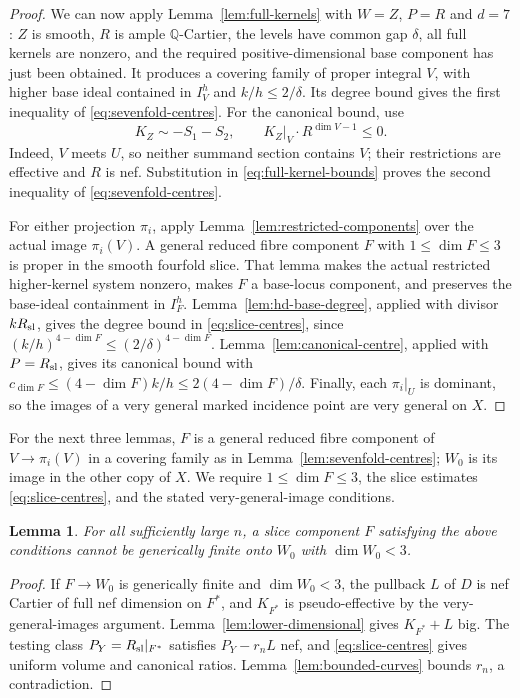 \documentclass[12pt,a4paper,psamsfonts]{amsart}
\theoremstyle{definition}
\theoremstyle{plain}
\newtheorem{lemma}{Lemma}[section]
\begin{document}
\begin{proof}
We can now apply Lemma~\ref{lem:full-kernels} with $W=Z$, $P=R$
and $d=7$: $Z$ is smooth, $R$ is ample $\mathbb{Q}$-Cartier, the
levels have common gap $\delta$, all full kernels are nonzero,
and the required positive-dimensional base component has just
been obtained. It produces a covering family of proper integral
$V$, with higher base ideal contained in $I_V^h$ and
$k/h\le2/\delta$. Its degree bound gives the first inequality
of \eqref{eq:sevenfold-centres}. For the canonical bound, use
\[
 K_Z\sim-S_1-S_2,\qquad
 K_Z|_V\cdot R^{\dim V-1}\le0.
\]
Indeed, $V$ meets $U$, so neither summand section contains $V$;
their restrictions are effective and $R$ is nef. Substitution
in \eqref{eq:full-kernel-bounds} proves the second inequality
of \eqref{eq:sevenfold-centres}.

For either projection $\pi_i$, apply
Lemma~\ref{lem:restricted-components} over the actual image
$\pi_i(V)$. A general reduced fibre component $F$ with
$1\le\dim F\le3$ is proper in the smooth fourfold slice.
That lemma makes the actual restricted higher-kernel system
nonzero, makes $F$ a base-locus component, and preserves the
base-ideal containment in $I_F^h$.
Lemma~\ref{lem:hd-base-degree}, applied with divisor $kR_{\rm sl}$,
gives the degree bound in \eqref{eq:slice-centres}, since
$(k/h)^{4-\dim F}\le(2/\delta)^{4-\dim F}$.
Lemma~\ref{lem:canonical-centre}, applied with $P=R_{\rm sl}$,
gives its canonical bound with
$c_{\dim F}\le(4-\dim F)k/h\le2(4-\dim F)/\delta$.
Finally, each $\pi_i|_U$ is dominant, so the images of a very
general marked incidence point are very general on $X$.
\end{proof}

For the next three lemmas, $F$ is a general reduced fibre component
of $V\to\pi_i(V)$ in a covering family as in
Lemma~\ref{lem:sevenfold-centres}; $W_0$ is its image in the other copy
of $X$. We require $1\le\dim F\le3$, the slice estimates
\eqref{eq:slice-centres}, and the stated very-general-image conditions.

\begin{lemma}\label{lem:slice-small-image}
For all sufficiently large $n$, a slice component $F$ satisfying
the above conditions cannot be generically finite onto $W_0$ with $\dim W_0<3$.
\end{lemma}
\begin{proof}
If $F\to W_0$ is generically finite and $\dim W_0<3$, the
pullback $L$ of $D$ is nef Cartier of full nef dimension on $F^*$,
and $K_{F^*}$ is pseudo-effective by the very-general-images
argument. Lemma~\ref{lem:lower-dimensional} gives $K_{F^*}+L$
big. The testing class $P_Y=R_{\rm sl}|_{F^*}$ satisfies
$P_Y-r_nL$ nef, and \eqref{eq:slice-centres} gives uniform volume
and canonical ratios. Lemma~\ref{lem:bounded-curves} bounds $r_n$,
a contradiction.
\end{proof}
\end{document}
